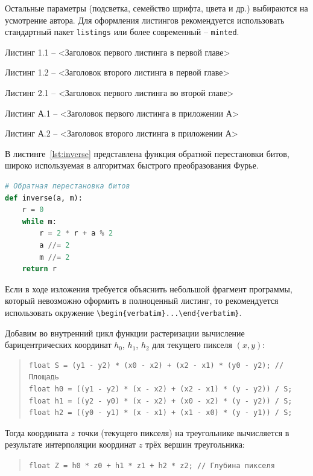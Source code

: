 \documentclass[14pt]{extarticle}
\begin{document}
Остальные параметры (подсветка, семейство шрифта, цвета и др.) выбираются на усмотрение автора.
Для оформления листингов рекомендуется использовать стандартный пакет \texttt{listings} или более современный -- \texttt{minted}.

\begin{tcolorbox}[title={Примеры подписей для листингов}]
	\small
	\par Листинг 1.1 -- <Заголовок первого листинга в первой главе>
	\par Листинг 1.2 -- <Заголовок второго листинга в первой главе>
	\par Листинг 2.1 -- <Заголовок первого листинга во второй главе>
	\par Листинг А.1 -- <Заголовок первого листинга в приложении А>
	\par Листинг А.2 -- <Заголовок второго листинга в приложении А>
\end{tcolorbox}

\begin{tcolorbox}[title={Пример ссылки на листинг}]
	В листинге~\ref{lst:inverse} представлена функция обратной перестановки битов, широко используемая в алгоритмах быстрого преобразования Фурье.
\end{tcolorbox}

\begin{lstlisting}[caption={Реализация обратной перестановки битов на языке Python}, label={lst:inverse}, language=Python]
# Обратная перестановка битов
def inverse(a, m):
	r = 0
	while m:
		r = 2 * r + a % 2
		a //= 2
		m //= 2
	return r
\end{lstlisting}

Если в ходе изложения требуется объяснить небольшой фрагмент программы, который невозможно оформить в полноценный листинг, то  рекомендуется использовать окружение \verb|\begin{verbatim}...\end{verbatim}|.

\begin{tcolorbox}[title={Пример использования окружения \texttt{verbatim}}]
\par Добавим  во внутренний цикл функции растеризации вычисление барицентрических координат $h_0$, $h_1$, $h_2$ для текущего пикселя $(x, y)$:
\begin{quote}
\small
\begin{verbatim}
float S = (y1 - y2) * (x0 - x2) + (x2 - x1) * (y0 - y2); // Площадь
float h0 = ((y1 - y2) * (x - x2) + (x2 - x1) * (y - y2)) / S;
float h1 = ((y2 - y0) * (x - x2) + (x0 - x2) * (y - y2)) / S;
float h2 = ((y0 - y1) * (x - x1) + (x1 - x0) * (y - y1)) / S;
\end{verbatim}
\end{quote}
\par Тогда координата $z$ точки (текущего пикселя) на треугольнике вычисляется в результате интерполяции координат $z$ трёх вершин треугольника:
\begin{quote}
	\small\verb|float Z = h0 * z0 + h1 * z1 + h2 * z2; // Глубина пикселя|
\end{quote}
\end{tcolorbox}
\end{document}
